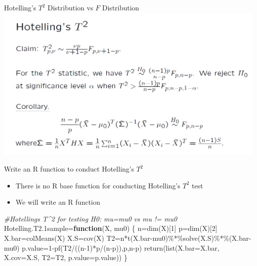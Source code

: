 \documentclass[
  ignorenonframetext,
]{beamer}
\newenvironment{Shaded}{\begin{snugshade}}{\end{snugshade}}
\newcommand{\AttributeTok}[1]{\textcolor[rgb]{0.77,0.63,0.00}{#1}}
\newcommand{\CommentTok}[1]{\textcolor[rgb]{0.56,0.35,0.01}{\textit{#1}}}
\newcommand{\ControlFlowTok}[1]{\textcolor[rgb]{0.13,0.29,0.53}{\textbf{#1}}}
\newcommand{\DecValTok}[1]{\textcolor[rgb]{0.00,0.00,0.81}{#1}}
\newcommand{\FloatTok}[1]{\textcolor[rgb]{0.00,0.00,0.81}{#1}}
\newcommand{\FunctionTok}[1]{\textcolor[rgb]{0.00,0.00,0.00}{#1}}
\newcommand{\NormalTok}[1]{#1}
\newcommand{\OtherTok}[1]{\textcolor[rgb]{0.56,0.35,0.01}{#1}}
\newcommand{\SpecialCharTok}[1]{\textcolor[rgb]{0.00,0.00,0.00}{#1}}
\providecommand{\tightlist}{%
  \setlength{\itemsep}{0pt}\setlength{\parskip}{0pt}}
\begin{document}
\begin{frame}{Hotelling's \(T^2\) Distribution vs \(F\) Distribution}
\protect\hypertarget{hotellings-t2-distribution-vs-f-distribution}{}
\includegraphics[width=0.8\linewidth]{img/T2vsF}
\end{frame}

\begin{frame}[fragile]{Write an R function to conduct Hotelling's
\(T^2\)}
\protect\hypertarget{write-an-r-function-to-conduct-hotellings-t2}{}
\begin{itemize}
\tightlist
\item
  There is no R base function for conducting Hotelling's \(T^2\) test
\item
  We will write an R function
\end{itemize}

\tiny

\begin{Shaded}
\begin{Highlighting}[]
\CommentTok{\#Hotelling\textquotesingle{}s T\^{}2 for testing H0: mu=mu0 vs mu != mu0}
\NormalTok{Hotelling.T2}\FloatTok{.1}\NormalTok{sample}\OtherTok{=}\ControlFlowTok{function}\NormalTok{(X, mu0)}
\NormalTok{\{}
\NormalTok{  n}\OtherTok{=}\FunctionTok{dim}\NormalTok{(X)[}\DecValTok{1}\NormalTok{]}
\NormalTok{  p}\OtherTok{=}\FunctionTok{dim}\NormalTok{(X)[}\DecValTok{2}\NormalTok{]}
\NormalTok{  X.bar}\OtherTok{=}\FunctionTok{colMeans}\NormalTok{(X)}
\NormalTok{  X.S}\OtherTok{=}\FunctionTok{cov}\NormalTok{(X)}
\NormalTok{  T2}\OtherTok{=}\NormalTok{n}\SpecialCharTok{*}\FunctionTok{t}\NormalTok{(X.bar}\SpecialCharTok{{-}}\NormalTok{mu0)}\SpecialCharTok{\%*\%}\FunctionTok{solve}\NormalTok{(X.S)}\SpecialCharTok{\%*\%}\NormalTok{(X.bar}\SpecialCharTok{{-}}\NormalTok{mu0)}
\NormalTok{  p.value}\OtherTok{=}\DecValTok{1}\SpecialCharTok{{-}}\FunctionTok{pf}\NormalTok{(T2}\SpecialCharTok{/}\NormalTok{((n}\DecValTok{{-}1}\NormalTok{)}\SpecialCharTok{*}\NormalTok{p}\SpecialCharTok{/}\NormalTok{(n}\SpecialCharTok{{-}}\NormalTok{p)),p,n}\SpecialCharTok{{-}}\NormalTok{p)}
  \FunctionTok{return}\NormalTok{(}\FunctionTok{list}\NormalTok{(}\AttributeTok{X.bar=}\NormalTok{X.bar, }\AttributeTok{X.cov=}\NormalTok{X.S, }\AttributeTok{T2=}\NormalTok{T2, }\AttributeTok{p.value=}\NormalTok{p.value))}
\NormalTok{\}}
\end{Highlighting}
\end{Shaded}

\normalsize
\end{frame}
\end{document}
